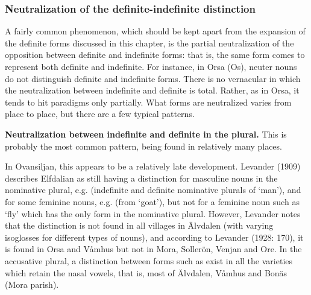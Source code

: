 \subsubsection[Neutralization of the definite{}-indefinite distinction]{\rmfamily Neutralization of the definite-indefinite distinction}
\label{bkm:Ref114304507}%
A fairly common phenomenon, which should be kept apart from the expansion of the definite forms discussed in this chapter, is the partial neutralization of the opposition between definite and indefinite forms: that is, the same form comes to represent both definite and indefinite. For instance, in Orsa (Os), neuter nouns do not distinguish definite and indefinite forms. There is no vernacular in which the neutralization between indefinite and definite is total. Rather, as in Orsa, it tends to hit paradigms only partially. What forms are neutralized varies from place to place, but there are a few typical patterns.

\textbf{Neutralization between indefinite and definite in the plural.} This is probably the most common pattern, being found in relatively many places. 

In Ovansiljan, this appears to be a relatively late development. Levander (1909) describes Elfdalian as still having a distinction for masculine nouns in the nominative plural, e.g. (indefinite and definite nominative plurals of ‘man’), and for some feminine nouns, e.g.  (from  ‘goat’), but not for a feminine noun such as ‘fly’ which has the only form  in the nominative plural. However, Levander notes that the distinction is not found in all villages in Älvdalen (with varying isoglosses for different types of nouns), and according to Levander (1928: 170), it is found in Orsa and Våmhus but not in Mora, Sollerön, Venjan and Ore. In the accusative plural, a distinction between forms such as exist in all the varieties which retain the nasal vowels, that is, most of Älvdalen, Våmhus and Bonäs (Mora parish). 


